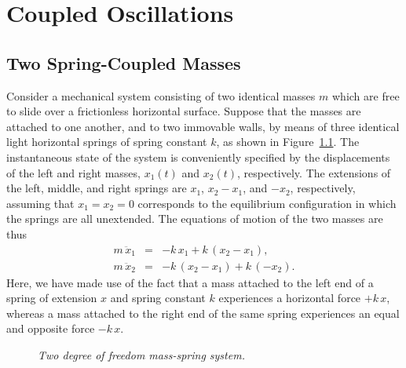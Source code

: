 \chapter{Coupled Oscillations}
\section{Two Spring-Coupled Masses}\label{s4.1}
Consider a mechanical system consisting of two identical masses $m$
which are free to slide over a frictionless horizontal surface. Suppose that
the masses are attached to  one another, and to two immovable
walls, by means of three identical light horizontal springs of spring constant $k$, as
shown in Figure~\ref{f4.1}. The instantaneous state of the system
is conveniently specified by the displacements of the left and
right masses, $x_1(t)$ and $x_2(t)$, respectively. The extensions
of the left, middle, and right springs are  $x_1$, $x_2-x_1$, and $-x_2$,
respectively, assuming that   $x_1=x_2=0$ corresponds to the equilibrium configuration in which the springs are all
unextended. The equations of motion of the two masses
are thus
\begin{eqnarray}\label{e4.1}
m\,\ddot{x}_1 &=&  -k\,x_1 +k\,(x_2-x_1),\\[0.5ex]
m\,\ddot{x}_2 &=&  -k\,(x_2-x_1) +k\,(-x_2).\label{e4.2}
\end{eqnarray}
Here, we have made use of the fact that a mass attached to the left end of a
spring of extension $x$ and spring constant $k$ experiences a horizontal force $+k\,x$,
whereas a mass attached to the right end of the same spring experiences an
equal and opposite force $-k\,x$. 

\begin{figure}
\epsfysize=1.4in
\centerline{}
\caption{\em Two degree of freedom mass-spring system.}\label{f4.1}   
\end{figure}

